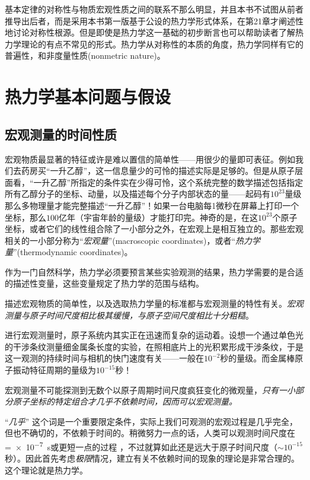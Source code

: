基本定律的对称性与物质宏观性质之间的联系不那么明显，并且本书不试图从前者推导出后者，而是采用本书第一版基于公设的热力学形式体系，在第21章才阐述性地讨论对称性根源。但是即使是热力学这一基础的初步断言也可以帮助读者了解热力学理论的有点不常见的形式。热力学从对称性的本质的角度，热力学同样有它的普遍性，和非度量性质(nonmetric nature)。



\chapter{热力学基本问题与假设}
\label{chap1}
\section{宏观测量的时间性质}
\label{sec1.1}
宏观物质最显著的特征或许是难以置信的简单性——用很少的量即可表征。例如我们去药房买“一升乙醇”，这一信息量少的可怜的描述实际是足够的。但是从原子层面看，“一升乙醇”所指定的条件实在少得可怜，这个系统完整的数学描述包括指定所有乙醇分子的坐标、动量，以及描述每个分子内部状态的量——起码有$10^{23}$量级那么多物理量才能完整描述“一升乙醇”！如果一台电脑每1微秒在屏幕上打印一个坐标，那么$100$亿年（宇宙年龄的量级）才能打印完。神奇的是，在这$10^{23}$个原子坐标，或者它们的线性组合除了一小部分之外，在宏观上是相互独立的。那些宏观相关的一小部分称为“{\it 宏观量}”(macroscopic coordinates)，或者“{\it 热力学量}”(thermodynamic coordinates)。

作为一门自然科学，热力学必须要预言某些实验观测的结果，热力学需要的是合适的描述性变量，这些变量规定了热力学的范围与结构。

描述宏观物质的简单性，以及选取热力学量的标准都与宏观测量的特性有关。{\it 宏观测量与原子时间尺度相比极其缓慢，与原子空间尺度相比十分粗糙}。

进行宏观测量时，原子系统内其实正在迅速而复杂的运动着。设想一个通过单色光的干涉条纹测量细金属条长度的实验，在照相底片上的光积累形成干涉条纹，于是这一观测的持续时间与相机的快门速度有关——一般在$10^{-2}$秒的量级。而金属棒原子振动特征周期的量级为$10^{-15}$秒！

宏观测量不可能探测到无数个以原子周期时间尺度疯狂变化的微观量，{\it 只有一小部分原子坐标的特定组合才几乎不依赖时间，因而可以宏观测量。}

“{\it 几乎}”%
%
这个词是一个重要限定条件，实际上我们可观测的宏观过程是几乎完全，但也不确切的，不依赖于时间的。稍微努力一点的话，人类可以观测时间尺度在=\SI{e-7}{\second}或更短一点的过程%
%
，不过就算如此还是远大于原子时间尺度（$\sim 10^{-15}$秒）。因此首先考虑{\it 极限}情况，建立有关不依赖时间的现象的理论是非常合理的。这个理论就是热力学。


